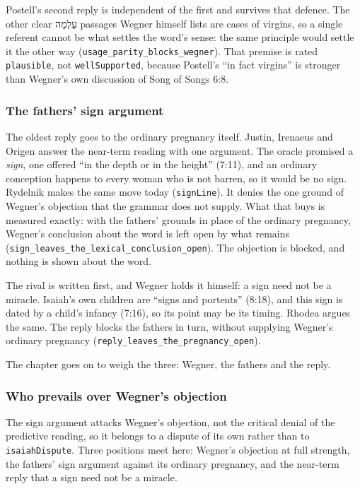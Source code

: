 \documentclass[11pt]{article}
\begin{document}
Postell’s second reply is independent of the first and survives that defence. The other clear עַלְמָה passages Wegner himself lists are cases of virgins, so a single referent cannot be what settles the word’s sense: the same principle would settle it the other way (\texttt{usage\_\allowbreak{}parity\_\allowbreak{}blocks\_\allowbreak{}wegner}). That premise is rated \texttt{plausible}, not \texttt{well\allowbreak{}Supported}, because Postell’s “in fact virgins” is stronger than Wegner’s own discussion of Song of Songs 6:8.

\subsubsection*{The fathers’ sign argument}
The oldest reply goes to the ordinary pregnancy itself. Justin, Irenaeus and Origen answer the near-term reading with one argument. The oracle promised a \emph{sign}, one offered “in the depth or in the height” (7:11), and an ordinary conception happens to every woman who is not barren, so it would be no sign. Rydelnik makes the same move today (\texttt{sign\allowbreak{}Line}). It denies the one ground of Wegner’s objection that the grammar does not supply. What that buys is measured exactly: with the fathers’ grounds in place of the ordinary pregnancy, Wegner’s conclusion about the word is left open by what remains (\texttt{sign\_\allowbreak{}leaves\_\allowbreak{}the\_\allowbreak{}lexical\_\allowbreak{}conclusion\_\allowbreak{}open}). The objection is blocked, and nothing is shown about the word.

The rival is written first, and Wegner holds it himself: a sign need not be a miracle. Isaiah’s own children are “signs and portents” (8:18), and this sign is dated by a child’s infancy (7:16), so its point may be its timing. Rhodea argues the same. The reply blocks the fathers in turn, without supplying Wegner’s ordinary pregnancy (\texttt{reply\_\allowbreak{}leaves\_\allowbreak{}the\_\allowbreak{}pregnancy\_\allowbreak{}open}).

The chapter goes on to weigh the three: Wegner, the fathers and the reply.

\subsubsection*{Who prevails over Wegner’s objection}
The sign argument attacks Wegner’s objection, not the critical denial of the predictive reading, so it belongs to a dispute of its own rather than to \texttt{isaiah\allowbreak{}Dispute}. Three positions meet here: Wegner’s objection at full strength, the fathers’ sign argument against its ordinary pregnancy, and the near-term reply that a sign need not be a miracle.
\end{document}

